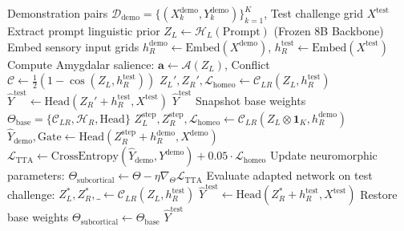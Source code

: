 \documentclass[11pt,a4paper]{article}
\theoremstyle{plain}
\theoremstyle{definition}
\theoremstyle{remark}
\newcommand{\HL}{\mathcal{H}_L}
\newcommand{\HR}{\mathcal{H}_R}
\newcommand{\CC}{\mathcal{C}_{LR}}
\newcommand{\AM}{\mathcal{A}}
\begin{document}
\begin{algorithm}[t]
\caption{Bi-Hemispheric Dynamic Inference and Test-Time Adaptation}
\label{alg:bihemispheric}
\begin{algorithmic}[1]
\REQUIRE Demonstration pairs $\mathcal{D}_{\mathrm{demo}} = \{(X_k^{\mathrm{demo}}, Y_k^{\mathrm{demo}})\}_{k=1}^K$, Test challenge grid $X^{\mathrm{test}}$
\STATE Extract prompt linguistic prior $Z_L \leftarrow \HL(\mathrm{Prompt})$ (Frozen 8B Backbone)
\STATE Embed sensory input grids $h_R^{\mathrm{demo}} \leftarrow \mathrm{Embed}(X^{\mathrm{demo}})$, $h_R^{\mathrm{test}} \leftarrow \mathrm{Embed}(X^{\mathrm{test}})$
\STATE Compute Amygdalar salience: $\mathbf{a} \leftarrow \AM(Z_L)$, Conflict $\mathcal{C} \leftarrow \frac{1}{2}(1 - \cos(Z_L, h_R^{\mathrm{test}}))$
    \STATE {}
    \STATE $Z_L', Z_R', \mathcal{L}_{\mathrm{homeo}} \leftarrow \CC(Z_L, h_R^{\mathrm{test}})$
    \STATE $\hat{Y}^{\mathrm{test}} \leftarrow \mathrm{Head}(Z_R' + h_R^{\mathrm{test}}, X^{\mathrm{test}})$
    \RETURN $\hat{Y}^{\mathrm{test}}$
\ELSE
    \STATE {}
    \STATE Snapshot base weights $\Theta_{\mathrm{base}} = \{\CC, \HR, \mathrm{Head}\}$
        \STATE $Z_L^{\mathrm{step}}, Z_R^{\mathrm{step}}, \mathcal{L}_{\mathrm{homeo}} \leftarrow \CC(Z_L \otimes \mathbf{1}_K, h_R^{\mathrm{demo}})$
        \STATE $\hat{Y}_{\mathrm{demo}}, \mathrm{Gate} \leftarrow \mathrm{Head}(Z_R^{\mathrm{step}} + h_R^{\mathrm{demo}}, X^{\mathrm{demo}})$
        \STATE $\mathcal{L}_{\mathrm{TTA}} \leftarrow \mathrm{CrossEntropy}(\hat{Y}_{\mathrm{demo}}, Y^{\mathrm{demo}}) + 0.05 \cdot \mathcal{L}_{\mathrm{homeo}}$
        \STATE Update neuromorphic parameters: $\Theta_{\mathrm{subcortical}} \leftarrow \Theta - \eta \nabla_\Theta \mathcal{L}_{\mathrm{TTA}}$
    \ENDFOR
    \STATE Evaluate adapted network on test challenge:
    \STATE $Z_L^*, Z_R^*, \_ \leftarrow \CC(Z_L, h_R^{\mathrm{test}})$
    \STATE $\hat{Y}^{\mathrm{test}} \leftarrow \mathrm{Head}(Z_R^* + h_R^{\mathrm{test}}, X^{\mathrm{test}})$
    \STATE Restore base weights $\Theta_{\mathrm{subcortical}} \leftarrow \Theta_{\mathrm{base}}$
    \RETURN $\hat{Y}^{\mathrm{test}}$
\ENDIF
\end{algorithmic}
\end{algorithm}
\end{document}

